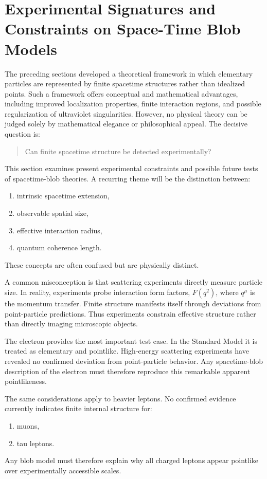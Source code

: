 \section{Experimental Signatures and Constraints on Space-Time Blob Models}
The preceding sections developed a theoretical framework in which elementary
particles are represented by finite spacetime structures rather than
idealized points. Such a framework offers conceptual and mathematical
advantages, including improved localization properties, finite interaction
regions, and possible regularization of ultraviolet singularities.
However, no physical theory can be judged solely by mathematical elegance or
philosophical appeal.
The decisive question is:
\begin{quote}
Can finite spacetime structure be detected experimentally?
\end{quote}
This section examines present experimental constraints and possible future
tests of spacetime-blob theories.
A recurring theme will be the distinction between:
\begin{enumerate}
\item intrinsic spacetime extension,
\item observable spatial size,
\item effective interaction radius,
\item quantum coherence length.
\end{enumerate}
These concepts are often confused but are physically distinct.

A common misconception is that scattering experiments directly measure particle size.
In reality, experiments probe interaction form factors,
$F(q^2)$, where $q^\mu $
is the momentum transfer.
Finite structure manifests itself through deviations from point-particle predictions.
Thus experiments constrain effective structure rather than directly imaging microscopic objects.

The electron provides the most important test case.
In the Standard Model it is treated as elementary and pointlike.
High-energy scattering experiments have revealed no confirmed deviation from point-particle behavior.
Any spacetime-blob description of the electron must therefore reproduce this remarkable apparent pointlikeness.

The same considerations apply to heavier leptons.
No confirmed evidence currently indicates finite internal structure for:
\begin{enumerate}
\item muons,
\item tau leptons.
\end{enumerate}
Any blob model must therefore explain why all charged leptons appear
pointlike over experimentally accessible scales.

